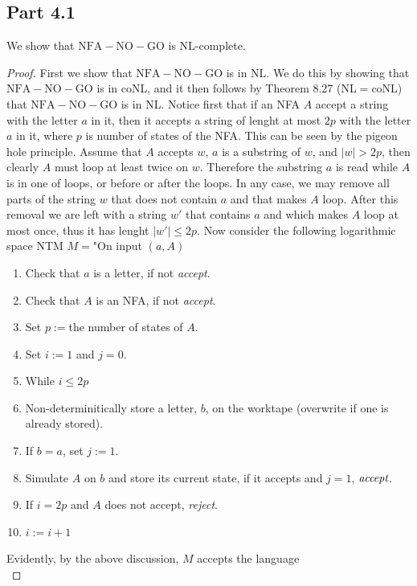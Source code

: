 \documentclass[a4paper,11pt]{article}
\newcommand{\abs}[1]{\left\lvert #1 \right\rvert}
\numberwithin{equation}{section}
\begin{document}
	\subsection*{Part 4.1}
	We show that $ \mathrm{NFA-NO-GO} $ is NL-complete.
	\begin{proof}
		First we show that $ \mathrm{NFA-NO-GO} $ is in NL. We do this by showing that $ \mathrm{NFA-NO-GO} $ is in coNL, and it then follows by Theorem 8.27 (NL$ = $coNL) that $ \mathrm{NFA-NO-GO} $ is in NL. Notice first that if an NFA $ A $ accept a string with the letter $ a $ in it, then it accepts a string of lenght at most $ 2p $ with the letter $ a $ in it, where $ p $ is number of states of the NFA. This can be seen by the pigeon hole principle. Assume that $ A $ accepts $ w $, $ a $ is a substring of $ w $, and $ \abs{w}>2p $, then clearly $ A $ must loop at least twice on $ w $. Therefore the substring $ a $ is read while $ A $ is in one of loops, or before or after the loops. In any case, we may remove all parts of the string $ w $ that does not contain $ a $ and that makes $ A $ loop. After this removal we are left with a string $ w' $ that contains $ a $ and which makes $ A $ loop at most once, thus it has lenght $ \abs{w'}\leq 2p $.  Now consider the following logarithmic space NTM $ M= $"On input $ (a,A) $\begin{enumerate}
			\item Check that $ a $ is a letter, if not \emph{accept}.
			\item Check that $ A $ is an NFA, if not \emph{accept}.
			\item Set $ p:= $the number of states of $ A $.
			\item Set $i:=1  $ and $ j=0 $.
			\item While $ i\leq 2p $
			\item \begin{addmargin}[2em]{0em} Non-determinitically store a letter, $ b $, on the worktape (overwrite if one is already stored).
			\end{addmargin} 
			\item \qquad If $ b=a $, set $ j:=1 $.
			\item \qquad Simulate $ A $ on $ b $ and store its current state, if it accepts and $ j=1 $, $ \emph{accept} $. 
			\item \qquad If $ i=2p $ and $ A $ does not accept, \emph{reject}.
			\item \qquad $ i:=i+1 $
		\end{enumerate} 
		Evidently, by the above discussion, $ M $ accepts the language \begin{equation*}

\end{equation*}
\end{proof}
\end{document}
